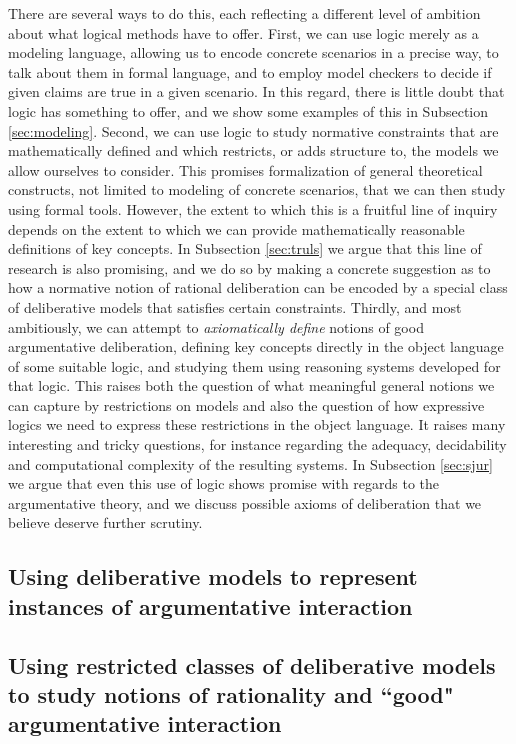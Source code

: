 \documentclass{article}
\begin{document}
There are several ways to do this, each reflecting a different level of ambition about what logical methods have to offer. First, we can use logic merely as a modeling language, allowing us to encode concrete scenarios in a precise way, to talk about them in formal language, and to employ model checkers to decide if given claims are true in a given scenario. In this regard, there is little doubt that logic has something to offer, and we show some examples of this in Subsection \ref{sec:modeling}. Second, we can use logic to study normative constraints that are mathematically defined and which restricts, or adds structure to, the models we allow ourselves to consider. This promises formalization of general theoretical constructs, not limited to modeling of concrete scenarios, that we can then study using formal tools. However, the extent to which this is a fruitful line of inquiry depends on the extent to which we can provide mathematically reasonable definitions of key concepts. In Subsection \ref{sec:truls} we argue that this line of research is also promising, and we do so by making a concrete suggestion as to how a normative notion of rational deliberation can be encoded by a special class of deliberative models that satisfies certain constraints. Thirdly, and most ambitiously, we can attempt to \emph{axiomatically define} notions of good argumentative deliberation, defining key concepts directly in the object language of some suitable logic, and studying them using reasoning systems developed for that logic. This raises both the question of what meaningful general notions we can capture by restrictions on models and also the question of how expressive logics we need to express these restrictions in the object language. It raises many interesting and tricky questions, for instance regarding the adequacy, decidability and computational complexity of the resulting systems. In Subsection \ref{sec:sjur} we argue that even this use of logic shows promise with regards to the argumentative theory, and we discuss possible axioms of deliberation that we believe deserve further scrutiny.

\subsection{Using deliberative models to represent instances of argumentative interaction}

\subsection{Using restricted classes of deliberative models to study notions of rationality and ``good" argumentative interaction}
\end{document}
